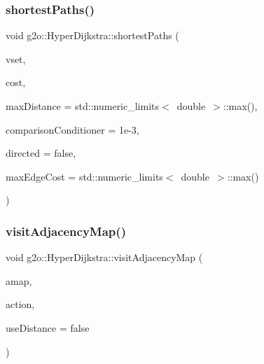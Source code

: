 \subsubsection{\texorpdfstring{shortest\+Paths()}{shortestPaths()}\hspace{0.1cm}{\footnotesize\ttfamily [2/2]}}
{\footnotesize\ttfamily void g2o\+::\+Hyper\+Dijkstra\+::shortest\+Paths (\begin{DoxyParamCaption}\item[{\mbox{\hyperlink{classg2o_1_1_hyper_graph_a703938cdb4bb636860eed55a2489d70c}{Hyper\+Graph\+::\+Vertex\+Set}} \&}]{vset,  }\item[{\mbox{\hyperlink{structg2o_1_1_hyper_dijkstra_1_1_cost_function}{Hyper\+Dijkstra\+::\+Cost\+Function}} $\ast$}]{cost,  }\item[{double}]{max\+Distance = {\ttfamily std\+:\+:numeric\+\_\+limits$<$~double~$>$\+:\+:max()},  }\item[{double}]{comparison\+Conditioner = {\ttfamily 1e-\/3},  }\item[{bool}]{directed = {\ttfamily false},  }\item[{double}]{max\+Edge\+Cost = {\ttfamily std\+:\+:numeric\+\_\+limits$<$~double~$>$\+:\+:max()} }\end{DoxyParamCaption})}

\mbox{\label{structg2o_1_1_hyper_dijkstra_aa73ae495f10f81823b16f26715f32c58}} 
\subsubsection{\texorpdfstring{visit\+Adjacency\+Map()}{visitAdjacencyMap()}}
{\footnotesize\ttfamily void g2o\+::\+Hyper\+Dijkstra\+::visit\+Adjacency\+Map (\begin{DoxyParamCaption}\item[{\mbox{\hyperlink{structg2o_1_1_hyper_dijkstra_af12ff8eef95094815a3fa1da0514bda2}{Adjacency\+Map}} \&}]{amap,  }\item[{\mbox{\hyperlink{structg2o_1_1_hyper_dijkstra_1_1_tree_action}{Tree\+Action}} $\ast$}]{action,  }\item[{bool}]{use\+Distance = {\ttfamily false} }\end{DoxyParamCaption})\hspace{0.3cm}{\ttfamily [static]}}

